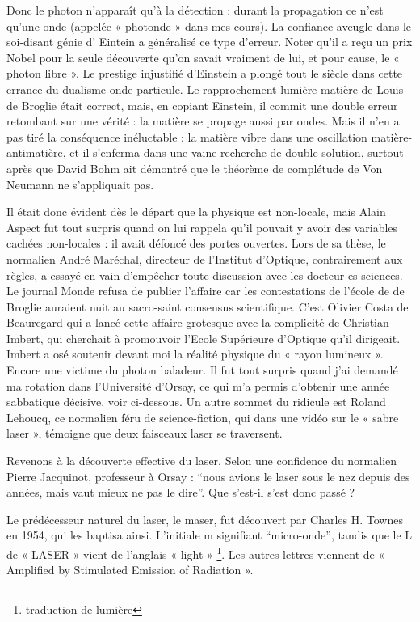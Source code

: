 \documentclass[a4paper,12pt]{article}
\begin{document}
Donc le photon n'apparaît qu'à la détection : durant la propagation ce n'est qu'une onde (appelée « photonde » dans mes cours). La confiance aveugle dans le soi-disant génie d' Eintein a généralisé ce type d'erreur. Noter qu'il a reçu un prix Nobel pour la seule découverte qu'on savait vraiment de lui, et pour cause, le « photon libre ». Le prestige injustifié d'Einstein a plongé tout le siècle dans cette errance du dualisme onde-particule. Le rapprochement lumière-matière de Louis de Broglie était correct, mais, en copiant Einstein, il commit une double erreur retombant sur une vérité : la matière se propage aussi par ondes. Mais il n'en a pas tiré la conséquence inéluctable : la matière vibre dans une oscillation matière-antimatière, et il s'enferma dans une vaine recherche de double solution, surtout après que David Bohm ait démontré que le théorème de complétude de Von Neumann ne s'appliquait pas.

Il était donc évident dès le départ que la physique est non-locale, mais Alain Aspect fut tout surpris quand on lui rappela qu'il pouvait y avoir des variables cachées non-locales : il avait défoncé des portes ouvertes. Lors de sa thèse, le normalien André Maréchal, directeur de l'Institut d'Optique, contrairement aux règles, a essayé en vain d'empêcher toute discussion avec les docteur es-sciences. Le journal Monde refusa de publier l'affaire car les contestations de l'école de de Broglie auraient nuit au sacro-saint consensus scientifique. C'est Olivier Costa de Beauregard qui a lancé cette affaire grotesque avec la complicité de Christian Imbert, qui cherchait à promouvoir l'Ecole Supérieure d'Optique qu'il dirigeait. Imbert a osé soutenir devant moi la réalité physique du « rayon lumineux ». Encore une victime du photon baladeur. Il fut tout surpris quand j'ai demandé ma rotation dans l'Université d'Orsay, ce qui m'a permis d'obtenir une année sabbatique décisive, voir ci-dessous. Un autre sommet du ridicule est Roland Lehoucq, ce normalien féru de science-fiction, qui dans une vidéo sur le « sabre laser », témoigne que deux faisceaux laser se traversent.

Revenons à la découverte effective du laser. Selon une confidence du normalien  Pierre Jacquinot, professeur à Orsay : ``nous avions le laser sous le nez depuis des années, mais vaut mieux ne pas le dire''. Que s'est-il s'est donc passé ?

Le prédécesseur naturel du laser, le maser, fut découvert par Charles H. Townes en 1954, qui les baptisa ainsi. L'initiale m signifiant ``micro-onde'', tandis que le L de « LASER » vient de l'anglais « light » \footnote{traduction de lumière}. Les autres lettres viennent de « Amplified by Stimulated Emission of Radiation ». 
\end{document}
